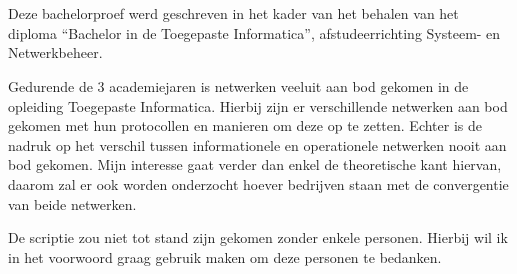 
\chapter*{}
\label{ch:voorwoord}

Deze bachelorproef werd geschreven in het kader van het behalen van het diploma ``Bachelor in de Toegepaste Informatica'', afstudeerrichting Systeem- en Netwerkbeheer.

Gedurende de 3 academiejaren is netwerken veeluit aan bod gekomen in de opleiding Toegepaste Informatica. Hierbij zijn er verschillende netwerken aan bod gekomen met hun protocollen en manieren om deze op te zetten. Echter is de nadruk op het verschil tussen informationele en operationele netwerken nooit aan bod gekomen. Mijn interesse gaat verder dan enkel de theoretische kant hiervan, daarom zal er ook worden onderzocht hoever bedrijven staan met de convergentie van beide netwerken.

De scriptie zou niet tot stand zijn gekomen zonder enkele personen. Hierbij wil ik in het voorwoord graag gebruik maken om deze personen te bedanken.


